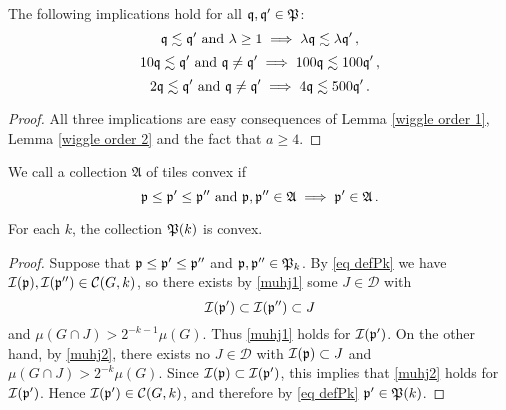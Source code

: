 {\begin{lemma}
\label{wiggle order 3}
    The following implications hold for all $\mathfrak q, \mathfrak q' \in \mathfrak P$:
    \begin{equation}
        \label{eq sc1}
        \mathfrak q \lesssim \mathfrak q' \ \text{and} \ \lambda \ge 1 \implies \lambda \mathfrak q \lesssim \lambda \mathfrak q'\,,
    \end{equation}
    \begin{equation}
        \label{eq sc2}
        10\mathfrak q \lesssim \mathfrak q' \ \text{and} \ \mathfrak q \ne \mathfrak q' \implies 100 \mathfrak q \lesssim 100 \mathfrak q'\,,
    \end{equation}
    \begin{equation}
        \label{eq sc3}
        2\mathfrak q \lesssim \mathfrak q' \ \text{and} \ \mathfrak q \ne \mathfrak q' \implies 4 \mathfrak q \lesssim 500 \mathfrak q'\,.
    \end{equation}
\end{lemma}

\begin{proof}
    All three implications are easy consequences of Lemma \ref{wiggle order 1}, Lemma \ref{wiggle order 2} and the fact that $a \ge 4$.
\end{proof}



We call a collection $\mathfrak{A}$ of tiles convex if
\begin{equation}
    \label{eq convexity}
    \mathfrak p \le \mathfrak p' \le \mathfrak p'' \ \text{and} \ \mathfrak p, \mathfrak p'' \in \mathfrak{A} \implies \mathfrak p' \in \mathfrak{A}\,.
\end{equation}

\begin{lemma}
    \label{P convex}
    For each $k$, the collection $\mathfrak P(k)$ is convex.
\end{lemma}

\begin{proof}
    Suppose that $\mathfrak p \le \mathfrak p' \le \mathfrak p''$ and $\mathfrak p, \mathfrak p'' \in \mathfrak P_k$. By \eqref{eq defPk} we have $\mathcal{I}(\mathfrak p), \mathcal{I}(\mathfrak p'') \in \mathcal{C}(G,k)$, so there exists by \eqref{muhj1} some $J \in \mathcal{D}$ with
    $$
        \mathcal{I}(\mathfrak p') \subset \mathcal{I}(\mathfrak p'') \subset J
    $$
    and $\mu(G \cap J) > 2^{-k-1} \mu(G)$. Thus \eqref{muhj1} holds for $\mathcal{I}(\mathfrak p')$. On the other hand, by \eqref{muhj2}, there exists no $J \in \mathcal{D}$ with $\mathcal{I}(\mathfrak p) \subset J$ and $\mu(G \cap J) > 2^{-k} \mu(G)$. Since $\mathcal{I}(\mathfrak p) \subset \mathcal{I}(\mathfrak p')$, this implies that \eqref{muhj2} holds for $\mathcal{I}(\mathfrak p')$. Hence $\mathcal{I}(\mathfrak p') \in \mathcal{C}(G,k)$, and therefore by \eqref{eq defPk} $\mathfrak p' \in \mathfrak P(k)$.
\end{proof}

}
